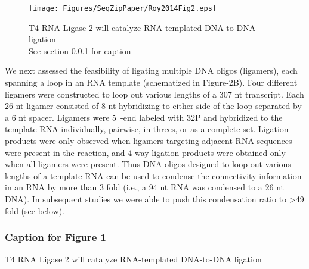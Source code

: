 		\begin{figure} %
			\centering 
			\texttt{[image: Figures/SeqZipPaper/Roy2014Fig2.eps]}
			\caption[T4 RNA Ligase 2 will catalyze RNA-templated DNA-to-DNA ligation]
			{
				T4 RNA Ligase 2 will catalyze RNA-templated DNA-to-DNA ligation \\[0.25cm]
				See section \ref{SeqZipPaper:figCap: Roy2014 F2} for caption
				}
			\label{SeqZipPaper:fig:Roy2014 F2}
			\end{figure}

		We next assessed the feasibility of ligating multiple DNA oligos (ligamers), each spanning a loop in an RNA template (schematized in Figure-2B). Four different ligamers were constructed to loop out various lengths of a 307 nt transcript. Each 26 nt ligamer consisted of 8 nt hybridizing to either side of the loop separated by a 6 nt spacer. Ligamers were 5\textprime~-end labeled with 32P and hybridized to the template RNA individually, pairwise, in threes, or as a complete set. Ligation products were only observed when ligamers targeting adjacent RNA sequences were present in the reaction, and 4-way ligation products were obtained only when all ligamers were present. Thus DNA oligos designed to loop out various lengths of a template RNA can be used to condense the connectivity information in an RNA by more than 3 fold (i.e., a 94 nt RNA was condensed to a 26 nt DNA). In subsequent studies we were able to push this condensation ratio to >49 fold (see below).

		\subsubsection{Caption for Figure \ref{SeqZipPaper:fig:Roy2014 F2}}\label{SeqZipPaper:figCap: Roy2014 F2}

			T4 RNA Ligase 2 will catalyze RNA-templated DNA-to-DNA ligation

